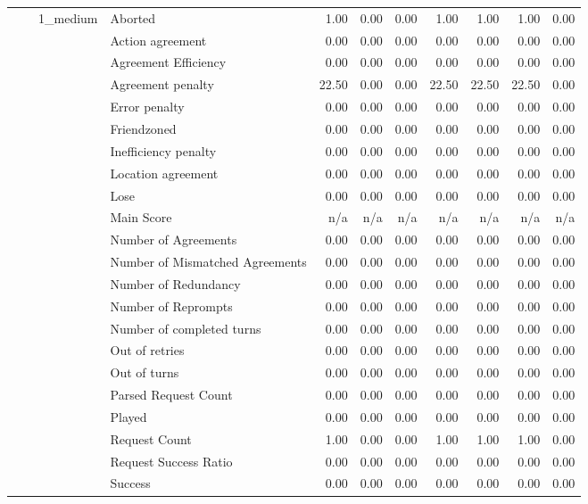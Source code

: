 \begin{tabular}{llllrrrrrrr}
\cline{3-11}
 &  & \multirow[t]{27}{*}{1_medium} & Aborted & 1.00 & 0.00 & 0.00 & 1.00 & 1.00 & 1.00 & 0.00 \\
 &  &  & Action agreement & 0.00 & 0.00 & 0.00 & 0.00 & 0.00 & 0.00 & 0.00 \\
 &  &  & Agreement Efficiency & 0.00 & 0.00 & 0.00 & 0.00 & 0.00 & 0.00 & 0.00 \\
 &  &  & Agreement penalty & 22.50 & 0.00 & 0.00 & 22.50 & 22.50 & 22.50 & 0.00 \\
 &  &  & Error penalty & 0.00 & 0.00 & 0.00 & 0.00 & 0.00 & 0.00 & 0.00 \\
 &  &  & Friendzoned & 0.00 & 0.00 & 0.00 & 0.00 & 0.00 & 0.00 & 0.00 \\
 &  &  & Inefficiency penalty & 0.00 & 0.00 & 0.00 & 0.00 & 0.00 & 0.00 & 0.00 \\
 &  &  & Location agreement & 0.00 & 0.00 & 0.00 & 0.00 & 0.00 & 0.00 & 0.00 \\
 &  &  & Lose & 0.00 & 0.00 & 0.00 & 0.00 & 0.00 & 0.00 & 0.00 \\
 &  &  & Main Score & n/a & n/a & n/a & n/a & n/a & n/a & n/a \\
 &  &  & Number of Agreements & 0.00 & 0.00 & 0.00 & 0.00 & 0.00 & 0.00 & 0.00 \\
 &  &  & Number of Mismatched Agreements & 0.00 & 0.00 & 0.00 & 0.00 & 0.00 & 0.00 & 0.00 \\
 &  &  & Number of Redundancy & 0.00 & 0.00 & 0.00 & 0.00 & 0.00 & 0.00 & 0.00 \\
 &  &  & Number of Reprompts & 0.00 & 0.00 & 0.00 & 0.00 & 0.00 & 0.00 & 0.00 \\
 &  &  & Number of completed turns & 0.00 & 0.00 & 0.00 & 0.00 & 0.00 & 0.00 & 0.00 \\
 &  &  & Out of retries & 0.00 & 0.00 & 0.00 & 0.00 & 0.00 & 0.00 & 0.00 \\
 &  &  & Out of turns & 0.00 & 0.00 & 0.00 & 0.00 & 0.00 & 0.00 & 0.00 \\
 &  &  & Parsed Request Count & 0.00 & 0.00 & 0.00 & 0.00 & 0.00 & 0.00 & 0.00 \\
 &  &  & Played & 0.00 & 0.00 & 0.00 & 0.00 & 0.00 & 0.00 & 0.00 \\
 &  &  & Request Count & 1.00 & 0.00 & 0.00 & 1.00 & 1.00 & 1.00 & 0.00 \\
 &  &  & Request Success Ratio & 0.00 & 0.00 & 0.00 & 0.00 & 0.00 & 0.00 & 0.00 \\
 &  &  & Success & 0.00 & 0.00 & 0.00 & 0.00 & 0.00 & 0.00 & 0.00 \\

\end{tabular}
